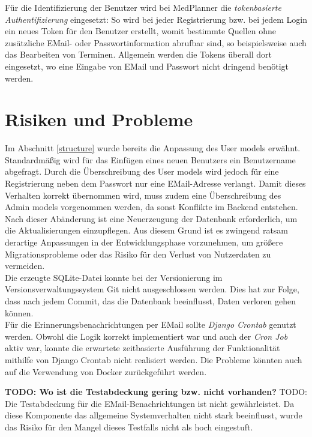 \documentclass[conference]{IEEEtran}
\begin{document}
Für die Identifizierung der Benutzer wird bei MedPlanner die \textit{tokenbasierte Authentifizierung} eingesetzt: So wird bei jeder Registrierung bzw. bei jedem Login ein neues Token für den Benutzer erstellt, womit bestimmte Quellen ohne zusätzliche EMail- oder Passwortinformation abrufbar sind, so beispielsweise auch das Bearbeiten von Terminen. Allgemein werden die Tokens überall dort eingesetzt, wo eine Eingabe von EMail und Passwort nicht dringend benötigt werden.

\section{Risiken und Probleme}
Im Abschnitt \ref{structure} wurde bereits die Anpassung des User models erwähnt. Standardmäßig wird für das Einfügen eines neuen Benutzers ein Benutzername abgefragt. Durch die Überschreibung des User models wird jedoch für eine Registrierung neben dem Passwort nur eine EMail-Adresse verlangt. Damit dieses Verhalten korrekt übernommen wird, muss zudem eine Überschreibung des Admin models vorgenommen werden, da sonst Konflikte im Backend entstehen. Nach dieser Abänderung ist eine Neuerzeugung der Datenbank erforderlich, um die Aktualisierungen einzupflegen. Aus diesem Grund ist es zwingend ratsam derartige Anpassungen in der Entwicklungsphase vorzunehmen, um größere Migrationsprobleme oder das Risiko für den Verlust von Nutzerdaten zu vermeiden.\\
Die erzeugte SQLite-Datei konnte bei der Versionierung im Versionsverwaltungssystem Git nicht ausgeschlossen werden. Dies hat zur Folge, dass nach jedem Commit, das die Datenbank beeinflusst, Daten verloren gehen können.\\
Für die Erinnerungsbenachrichtungen per EMail sollte \textit{Django Crontab} genutzt werden. Obwohl die Logik korrekt implementiert war und auch der \textit{Cron Job} aktiv war, konnte die erwartete zeitbasierte Ausführung der Funktionalität mithilfe von Django Crontab nicht realisiert werden. Die Probleme könnten auch auf die Verwendung von Docker zurückgeführt werden.


\textbf{TODO: Wo ist die Testabdeckung gering bzw. nicht vorhanden?}
TODO: Die Testabdeckung für die EMail-Benachrichtungen ist nicht gewährleistet. Da diese Komponente das allgemeine Systemverhalten nicht stark beeinflusst, wurde das Risiko für den Mangel dieses Testfalls nicht als hoch eingestuft. 
\end{document}
